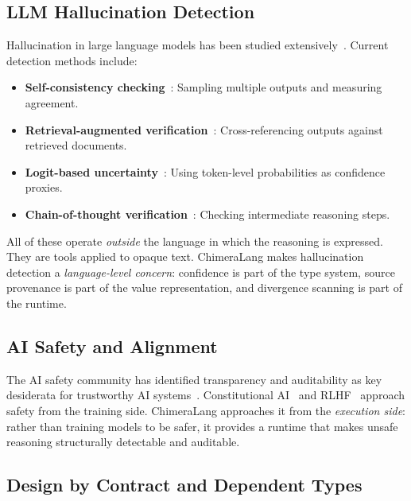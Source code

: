 \documentclass[11pt,a4paper]{article}
\begin{document}
\subsection{LLM Hallucination Detection}

Hallucination in large language models has been studied
extensively~\cite{ji2023hallucination, zhang2023sirens, huang2023survey}.
Current detection methods include:

\begin{itemize}[leftmargin=2em]
  \item \textbf{Self-consistency checking}~\cite{manakul2023selfcheckgpt}:
    Sampling multiple outputs and measuring agreement.
  \item \textbf{Retrieval-augmented verification}~\cite{lewis2020retrieval}:
    Cross-referencing outputs against retrieved documents.
  \item \textbf{Logit-based uncertainty}~\cite{kadavath2022language}:
    Using token-level probabilities as confidence proxies.
  \item \textbf{Chain-of-thought verification}~\cite{wei2022chain}:
    Checking intermediate reasoning steps.
\end{itemize}

All of these operate \emph{outside} the language in which the reasoning is
expressed. They are tools applied to opaque text. ChimeraLang makes hallucination
detection a \emph{language-level concern}: confidence is part of the type system,
source provenance is part of the value representation, and divergence scanning is
part of the runtime.

\subsection{AI Safety and Alignment}

The AI safety community has identified transparency and
auditability as key desiderata for trustworthy AI
systems~\cite{amodei2016concrete, hendrycks2022unsolved}. Constitutional
AI~\cite{bai2022constitutional} and RLHF~\cite{ouyang2022training} approach
safety from the training side. ChimeraLang approaches it from the
\emph{execution side}: rather than training models to be safer, it provides a
runtime that makes unsafe reasoning structurally detectable and auditable.

\subsection{Design by Contract and Dependent Types}
\end{document}
